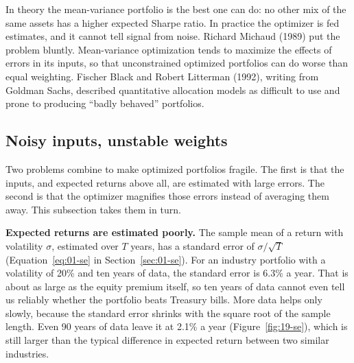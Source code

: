 In theory the mean-variance portfolio is the best one can do: no other mix of the same assets has a higher expected Sharpe ratio. In practice the optimizer is fed estimates, and it cannot tell signal from noise. Richard Michaud (1989) put the problem bluntly. Mean-variance optimization tends to maximize the effects of errors in its inputs, so that unconstrained optimized portfolios can do worse than equal weighting. Fischer Black and Robert Litterman (1992), writing from Goldman Sachs, described quantitative allocation models as difficult to use and prone to producing ``badly behaved'' portfolios.

\subsection{Noisy inputs, unstable weights}
\label{sec:19-estimation}

Two problems combine to make optimized portfolios fragile. The first is that the inputs, and expected returns above all, are estimated with large errors. The second is that the optimizer magnifies those errors instead of averaging them away. This subsection takes them in turn.

\textbf{Expected returns are estimated poorly.} The sample mean of a return with volatility $\sigma$, estimated over $T$ years, has a standard error of $\sigma/\sqrt{T}$ (Equation~\eqref{eq:01-se} in Section~\ref{sec:01-se}). For an industry portfolio with a volatility of 20\% and ten years of data, the standard error is 6.3\% a year. That is about as large as the equity premium itself, so ten years of data cannot even tell us reliably whether the portfolio beats Treasury bills. More data helps only slowly, because the standard error shrinks with the square root of the sample length. Even 90 years of data leave it at 2.1\% a year (Figure~\ref{fig:19-se}), which is still larger than the typical difference in expected return between two similar industries.


